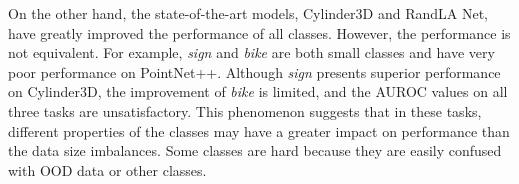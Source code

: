 \documentclass[journal]{IEEEtran}
\begin{document}
On the other hand, the state-of-the-art models, Cylinder3D and RandLA Net, have greatly improved the performance of all classes.
However, the performance is not equivalent. For example, \textit{sign} and \textit{bike} are both small classes and have very poor performance on PointNet++. Although \textit{sign} presents superior performance on Cylinder3D, the improvement of \textit{bike} is limited, and the AUROC values on all three tasks are unsatisfactory.
This phenomenon suggests that in these tasks, different properties of the classes may have a greater impact on performance than the data size imbalances. Some classes are hard because they are easily confused with OOD data or other classes.


%
%
%
\end{document}
